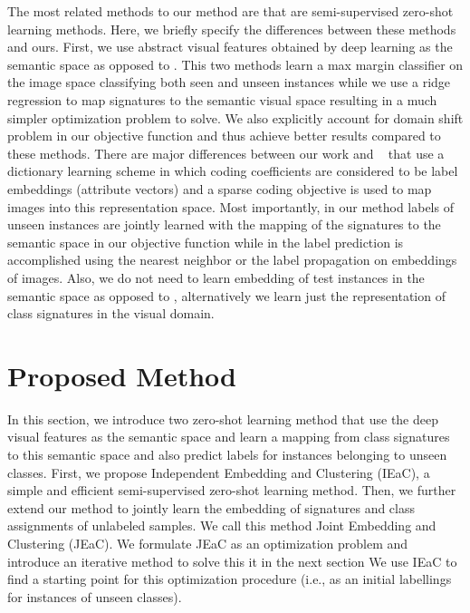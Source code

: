 \documentclass[letterpaper]{article}
\begin{document}
The most related methods to our method are  \cite{li15max,Kodirov2015,semi15}
 that are semi-supervised zero-shot learning methods.
Here, we briefly specify the differences between these methods and ours.
 First, we use abstract visual features obtained by deep learning as the semantic space as opposed to  \cite{li15max,semi15}.
 This two methods learn a max margin classifier on the image space classifying both seen and unseen
instances while we use a ridge regression to map signatures to the semantic visual space resulting
 in a much simpler optimization problem to solve.
 We also explicitly account for domain shift problem in our objective function and thus achieve better results compared to these methods.
%
There are major differences between our work and ~\cite{Kodirov2015} that use a dictionary learning scheme
in which coding coefficients are considered to be label embeddings (attribute vectors) and a sparse coding objective is used to map images into this representation space.
Most importantly, in our method labels of unseen instances are jointly learned
with the mapping of the signatures to the semantic space in our objective function while in \cite{Kodirov2015}
the label prediction is accomplished using the nearest neighbor or the label propagation on embeddings of images.
Also, we do not need to learn embedding of test instances in the semantic space as opposed to \cite{Kodirov2015},
alternatively we learn just the representation of class signatures in the visual domain.

\section{Proposed Method} \label{proposed}
In this section, we introduce two zero-shot learning method that use the deep visual features as the semantic space and learn
a mapping from class signatures to this semantic space and also predict labels for instances belonging to unseen classes.
 First, we propose Independent Embedding and Clustering (IEaC), a simple and efficient semi-supervised zero-shot learning method.
Then, we further extend our method to jointly learn the embedding of signatures and class assignments of unlabeled samples.
We call this method Joint Embedding and Clustering (JEaC). We formulate JEaC as an optimization problem and
 introduce an iterative method to solve this it in the next section
 We use IEaC to find a starting point for this optimization procedure (i.e., as an initial labellings for instances of unseen classes).
\end{document}
